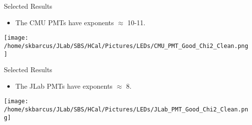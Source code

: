 \documentclass[10pt]{beamer}
\begin{document}
\begin{frame}{Selected Results}

	\begin{itemize}
		\item The CMU PMTs have exponents $\approx$ 10-11.
	\end{itemize}
	
	\begin{center}
		\texttt{[image: /home/skbarcus/JLab/SBS/HCal/Pictures/LEDs/CMU\_PMT\_Good\_Chi2\_Clean.png]}
  	\end{center}

\end{frame}

\begin{frame}{Selected Results}

	\begin{itemize}
		\item The JLab PMTs have exponents $\approx$ 8.
	\end{itemize}
	
	\begin{center}
		\texttt{[image: /home/skbarcus/JLab/SBS/HCal/Pictures/LEDs/JLab\_PMT\_Good\_Chi2\_Clean.png]}
  	\end{center}

\end{frame}
\end{document}
